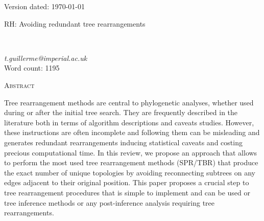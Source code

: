 \documentclass[12pt,letterpaper]{article}
\renewcommand{\section}[1]{%
\bigskip
\begin{center}
\begin{Large}
\normalfont\scshape #1
\medskip
\end{Large}
\end{center}}
\begin{document}

\begin{flushright}
Version dated: \today
\end{flushright}
\bigskip
\noindent RH: Avoiding redundant tree rearrangements

\bigskip
\medskip
\begin{center}

\bigskip

\\ %
\end{center}
\medskip
{} \textit{t.guillerme@imperial.ac.uk}\\  %
\medskip
Word count: 1195
\vspace{1in}

\modulolinenumbers[1]
\linenumbers

%
%

\newpage
\section{Abstract}
Tree rearrangement methods are central to phylogenetic analyses, whether used during or after the initial tree search.
They are frequently described in the literature both in terms of algorithm descriptions and caveats studies.
However, these instructions are often incomplete and following them can be misleading and generates redundant rearrangements inducing statistical caveats and costing precious computational time.
In this review, we propose an approach that allows to perform the most used tree rearrangement methods (SPR/TBR) that produce the exact number of unique topologies by avoiding reconnecting subtrees on any edges adjacent to their original position.
This paper proposes a crucial step to tree rearrangement procedures that is simple to implement and can be used or tree inference methods or any post-inference analysis requiring tree rearrangements.
\end{document}
